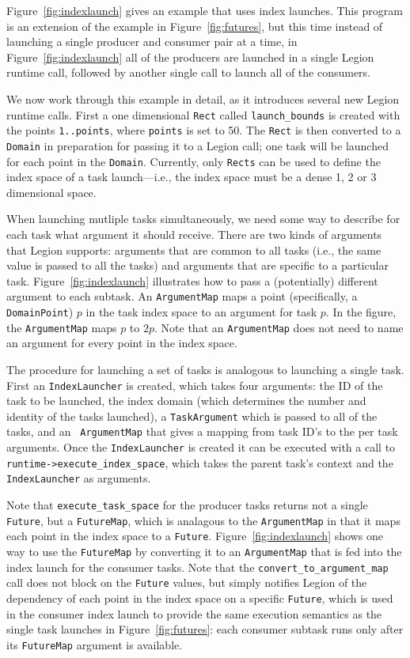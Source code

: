 \documentclass[11pt]{book}
\begin{document}
Figure~\ref{fig:indexlaunch} gives an example that uses index
launches. This program is an extension of the example in
Figure~\ref{fig:futures}, but this time instead of launching a single
producer and consumer pair at a time, in Figure~\ref{fig:indexlaunch}
all of the producers are launched in a single Legion runtime call,
followed by another single call to launch all of the consumers.

We now work through this example in detail, as it introduces several
new Legion runtime calls.  First a one dimensional {\tt Rect} called
{\tt launch\_bounds} is created with the points {\tt 1..points}, where
{\tt points} is set to 50. The {\tt Rect} is then converted to a {\tt
  Domain} in preparation for passing it to a Legion call; one task will
be launched for each point in the {\tt Domain}.  Currently, only
{\tt Rects} can be used to define the index space of a task launch---i.e.,
the index space must be a dense 1, 2 or 3 dimensional space.

When launching mutliple tasks simultaneously, we need some way to
describe for each task what argument it should receive.  There are two
kinds of arguments that Legion supports: arguments that are common to
all tasks (i.e., the same value is passed to all the tasks) and
arguments that are specific to a particular task.
Figure~\ref{fig:indexlaunch} illustrates how to pass a (potentially)
different argument to each subtask.  An {\tt ArgumentMap} maps a point
(specifically, a {\tt DomainPoint}) $p$ in the task index space to an
argument for task $p$. In the figure, the {\tt ArgumentMap} maps $p$
to $2p$.  Note that an {\tt ArgumentMap} does not need to name an argument
for every point in the index space.

The procedure for launching a set of tasks is analogous to launching a
single task.  First an {\tt IndexLauncher} is created, which takes
four arguments: the ID of the task to be launched, the index domain
(which determines the number and identity of the tasks launched), a
{\tt TaskArgument} which is passed to all of the tasks, and an {\tt
  ArgumentMap} that gives a mapping from task ID's to the per task
arguments.  Once the {\tt IndexLauncher} is created it can be executed
with a call to {\tt runtime->execute\_index\_space}, which 
takes the parent task's context and the {\tt IndexLauncher} as arguments.

Note that {\tt execute\_task\_space} for the producer tasks returns not
a single {\tt Future}, but a {\tt FutureMap}, which is analagous to
the {\tt ArgumentMap} in that it maps each point in the index
space to a {\tt Future}.  Figure~\ref{fig:indexlaunch} shows one way to
use the {\tt FutureMap} by converting it to an {\tt ArgumentMap} that is fed into
the index launch for the consumer tasks.  Note that the {\tt convert\_to\_argument\_map} call
does not block on the {\tt Future} values, but simply notifies Legion of the dependency
of each point in the index space on a specific {\tt Future}, which is used in the
consumer index launch to provide the same execution semantics as the single task
launches in Figure~\ref{fig:futures}: each consumer subtask runs only after its {\tt FutureMap}
argument is available.
\end{document}
